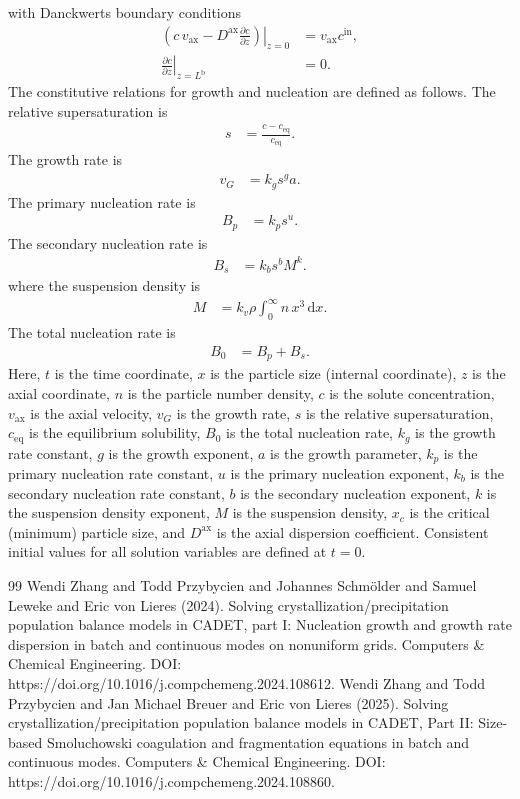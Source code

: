 \documentclass{article}
\begin{document}
with Danckwerts boundary conditions
\begin{align}
    \left. \left( c \, v_{\mathrm{ax}} - D^{\mathrm{ax}} \frac{\partial c}{\partial z} \right) \right|_{z=0}
    &= v_{\mathrm{ax}} c^{\mathrm{in}},
    \\
    \left. \frac{\partial c}{\partial z} \right|_{z=L^{\mathrm{b}}}
    &= 0.
\end{align}
The constitutive relations for growth and nucleation are defined as follows.
The relative supersaturation is
\begin{align}
    s
    &= \frac{c - c_{\mathrm{eq}}}{c_{\mathrm{eq}}}.
\end{align}
The growth rate is
\begin{align}
    v_{G}
    &= k_{g} s^{g} a.
\end{align}
The primary nucleation rate is
\begin{align}
    B_{p}
    &= k_{p} s^{u}.
\end{align}
The secondary nucleation rate is
\begin{align}
    B_{s}
    &= k_{b} s^{b} M^{k}.
\end{align}
where the suspension density is
\begin{align}
    M
    &= k_{v} \rho \int_{0}^{\infty} n \, x^{3} \, \mathrm{d}x.
\end{align}
The total nucleation rate is
\begin{align}
    B_{0}
    &= B_{p}
        + B_{s}.
\end{align}
Here, $t$ is the time coordinate, $x$ is the particle size (internal coordinate), $z$ is the axial coordinate, $n$ is the particle number density, $c$ is the solute concentration, $v_{\mathrm{ax}}$ is the axial velocity, $v_{G}$ is the growth rate, $s$ is the relative supersaturation, $c_{\mathrm{eq}}$ is the equilibrium solubility, $B_{0}$ is the total nucleation rate, $k_{g}$ is the growth rate constant, $g$ is the growth exponent, $a$ is the growth parameter, $k_{p}$ is the primary nucleation rate constant, $u$ is the primary nucleation exponent, $k_{b}$ is the secondary nucleation rate constant, $b$ is the secondary nucleation exponent, $k$ is the suspension density exponent, $M$ is the suspension density, $x_{c}$ is the critical (minimum) particle size, and $D^{\mathrm{ax}}$ is the axial dispersion coefficient.
Consistent initial values for all solution variables are defined at $t = 0$.
\begin{thebibliography}{99}
     Wendi Zhang and Todd Przybycien and Johannes Schmölder and Samuel Leweke and Eric von Lieres (2024). Solving crystallization/precipitation population balance models in CADET, part I: Nucleation growth and growth rate dispersion in batch and continuous modes on nonuniform grids. Computers \& Chemical Engineering. DOI: https://doi.org/10.1016/j.compchemeng.2024.108612.
     Wendi Zhang and Todd Przybycien and Jan Michael Breuer and Eric von Lieres (2025). Solving crystallization/precipitation population balance models in CADET, Part II: Size-based Smoluchowski coagulation and fragmentation equations in batch and continuous modes. Computers \& Chemical Engineering. DOI: https://doi.org/10.1016/j.compchemeng.2024.108860.
\end{thebibliography}
\end{document}
